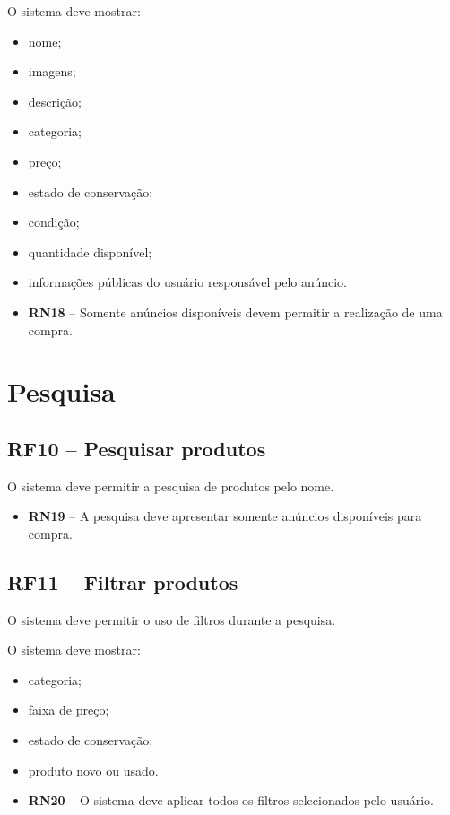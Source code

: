 \documentclass{scrreprt}
\newenvironment{fieldlist}
	{\renewcommand{\labelitemi}{--}\begin{itemize}}
	{\end{itemize}}
\begin{document}
O sistema deve mostrar:
\begin{fieldlist}
	\item nome;
	\item imagens;
	\item descrição;
	\item categoria;
	\item preço;
	\item estado de conservação;
	\item condição;
	\item quantidade disponível;
	\item informações públicas do usuário responsável pelo anúncio.
\end{fieldlist}

\begin{itemize}
	\item \textbf{RN18} -- Somente anúncios disponíveis devem permitir a realização de uma compra.
\end{itemize}

\section{Pesquisa}

\subsection{RF10 -- Pesquisar produtos}
O sistema deve permitir a pesquisa de produtos pelo nome.
\begin{itemize}
	\item \textbf{RN19} -- A pesquisa deve apresentar somente anúncios disponíveis para compra.
\end{itemize}

\subsection{RF11 -- Filtrar produtos}
O sistema deve permitir o uso de filtros durante a pesquisa.

O sistema deve mostrar:
\begin{fieldlist}
	\item categoria;
	\item faixa de preço;
	\item estado de conservação;
	\item produto novo ou usado.
\end{fieldlist}

\begin{itemize}
	\item \textbf{RN20} -- O sistema deve aplicar todos os filtros selecionados pelo usuário.
\end{itemize}
\end{document}

